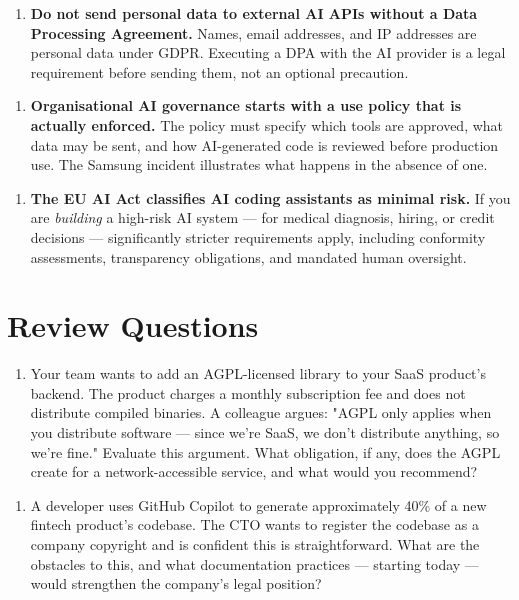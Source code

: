 \documentclass[11pt,a4paper]{book}
\begin{document}
\begin{enumerate}
  \item \textbf{Do not send personal data to external AI APIs without a Data Processing Agreement.} Names, email addresses, and IP addresses are personal data under GDPR. Executing a DPA with the AI provider is a legal requirement before sending them, not an optional precaution.
\end{enumerate}

\begin{enumerate}
  \item \textbf{Organisational AI governance starts with a use policy that is actually enforced.} The policy must specify which tools are approved, what data may be sent, and how AI-generated code is reviewed before production use. The Samsung incident illustrates what happens in the absence of one.
\end{enumerate}

\begin{enumerate}
  \item \textbf{The EU AI Act classifies AI coding assistants as minimal risk.} If you are \textit{building} a high-risk AI system --- for medical diagnosis, hiring, or credit decisions --- significantly stricter requirements apply, including conformity assessments, transparency obligations, and mandated human oversight.
\end{enumerate}

\medskip

\section{Review Questions}

\begin{enumerate}
  \item Your team wants to add an AGPL-licensed library to your SaaS product's backend. The product charges a monthly subscription fee and does not distribute compiled binaries. A colleague argues: "AGPL only applies when you distribute software --- since we're SaaS, we don't distribute anything, so we're fine." Evaluate this argument. What obligation, if any, does the AGPL create for a network-accessible service, and what would you recommend?
\end{enumerate}

\begin{enumerate}
  \item A developer uses GitHub Copilot to generate approximately 40\% of a new fintech product's codebase. The CTO wants to register the codebase as a company copyright and is confident this is straightforward. What are the obstacles to this, and what documentation practices --- starting today --- would strengthen the company's legal position?
\end{enumerate}
\end{document}
